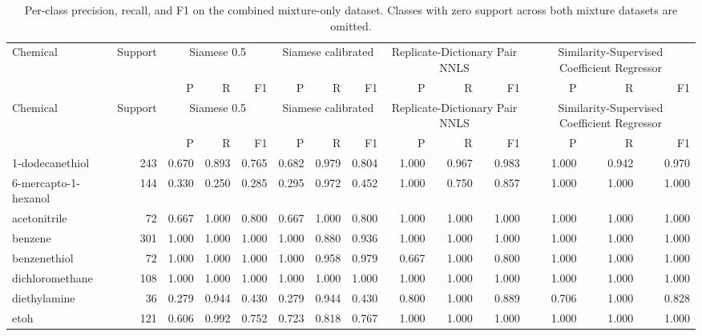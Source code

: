 \documentclass[11pt]{article}
\begin{document}
\begin{landscape}
\begin{center}
\small
\begin{longtable}{lrrrrrrrrrrrrr}
\caption{Per-class precision, recall, and F1 on the combined mixture-only dataset. Classes with zero support across both mixture datasets are omitted.}\\
\toprule
Chemical & Support & \multicolumn{3}{c}{Siamese 0.5} & \multicolumn{3}{c}{Siamese calibrated} & \multicolumn{3}{c}{Replicate-Dictionary Pair NNLS} & \multicolumn{3}{c}{Similarity-Supervised Coefficient Regressor} \\
\cmidrule(lr){3-5} \cmidrule(lr){6-8} \cmidrule(lr){9-11} \cmidrule(lr){12-14}
 &  & P & R & F1 & P & R & F1 & P & R & F1 & P & R & F1 \\
\midrule
\endfirsthead
\toprule
Chemical & Support & \multicolumn{3}{c}{Siamese 0.5} & \multicolumn{3}{c}{Siamese calibrated} & \multicolumn{3}{c}{Replicate-Dictionary Pair NNLS} & \multicolumn{3}{c}{Similarity-Supervised Coefficient Regressor} \\
\cmidrule(lr){3-5} \cmidrule(lr){6-8} \cmidrule(lr){9-11} \cmidrule(lr){12-14}
 &  & P & R & F1 & P & R & F1 & P & R & F1 & P & R & F1 \\
\midrule
\endhead
        1-dodecanethiol & 243 & 0.670 & 0.893 & 0.765 & 0.682 & 0.979 & 0.804 & 1.000 & 0.967 & 0.983 & 1.000 & 0.942 & 0.970 \\
        6-mercapto-1-hexanol & 144 & 0.330 & 0.250 & 0.285 & 0.295 & 0.972 & 0.452 & 1.000 & 0.750 & 0.857 & 1.000 & 1.000 & 1.000 \\
        acetonitrile & 72 & 0.667 & 1.000 & 0.800 & 0.667 & 1.000 & 0.800 & 1.000 & 1.000 & 1.000 & 1.000 & 1.000 & 1.000 \\
        benzene & 301 & 1.000 & 1.000 & 1.000 & 1.000 & 0.880 & 0.936 & 1.000 & 1.000 & 1.000 & 1.000 & 1.000 & 1.000 \\
        benzenethiol & 72 & 1.000 & 1.000 & 1.000 & 1.000 & 0.958 & 0.979 & 0.667 & 1.000 & 0.800 & 1.000 & 1.000 & 1.000 \\
        dichloromethane & 108 & 1.000 & 1.000 & 1.000 & 1.000 & 1.000 & 1.000 & 1.000 & 1.000 & 1.000 & 1.000 & 1.000 & 1.000 \\
        diethylamine & 36 & 0.279 & 0.944 & 0.430 & 0.279 & 0.944 & 0.430 & 0.800 & 1.000 & 0.889 & 0.706 & 1.000 & 0.828 \\
        etoh & 121 & 0.606 & 0.992 & 0.752 & 0.723 & 0.818 & 0.767 & 1.000 & 1.000 & 1.000 & 1.000 & 1.000 & 1.000 \\

\end{longtable}
\end{center}
\end{landscape}
\end{document}
